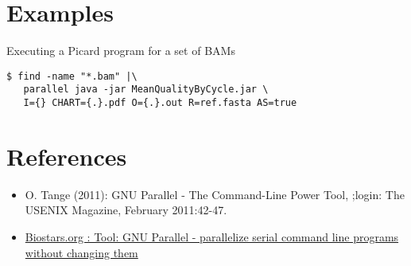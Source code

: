 \documentclass{article}
\begin{document}
\section{Examples}
Executing a Picard program for a set of BAMs

\begin{lstlisting}
$ find -name "*.bam" |\
   parallel java -jar MeanQualityByCycle.jar \
   I={} CHART={.}.pdf O={.}.out R=ref.fasta AS=true
\end{lstlisting}

\section{References}
\begin{itemize}
\item O. Tange (2011): GNU Parallel - The Command-Line Power Tool, ;login: The USENIX Magazine, February 2011:42-47.
\item \href{http://www.biostars.org/p/63816/}{Biostars.org : Tool: GNU Parallel - parallelize serial command line programs without changing them}
\end{itemize}
\end{document}
